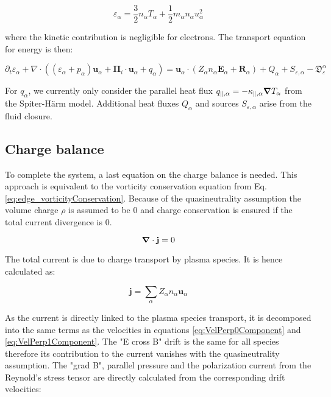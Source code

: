 \begin{equation}
	\varepsilon_\alpha = \frac{3}{2} n_\alpha T_\alpha + \frac{1}{2} m_\alpha n_\alpha u_\alpha^2
\end{equation}

where the kinetic contribution is negligible for electrons. The transport equation for energy is then: 

\begin{equation}
	\partial_t \varepsilon_\alpha + \nabla \cdot \left( (\varepsilon_\alpha + p_\alpha)\mathbf{u}_\alpha + \boldsymbol{\Pi}_i\cdot\mathbf{u}_\alpha + q_\alpha \right) = \mathbf{u}_\alpha \cdot \left(Z_\alpha n_\alpha\mathbf{E}_\alpha + \mathbf{R}_\alpha \right) + Q_\alpha + S_{\varepsilon,\alpha} - \mathfrak{D}_\varepsilon^\alpha
\end{equation}

For $q_\alpha$, we currently only consider the parallel heat flux $q_{\parallel,\alpha} = -\kappa_{\parallel,\alpha}\grad T_\alpha$ from the Spiter-Härm model. Additional heat fluxes $Q_\alpha$ and sources $S_{\varepsilon,\alpha}$ arise from the fluid closure.



\subsection{Charge balance}

To complete the system, a last equation on the charge balance is needed. This approach is equivalent to the vorticity conservation equation from Eq. \ref{eq:edge_vorticityConservation}. Because of the quasineutrality assumption the volume charge $\rho$ is assumed to be 0 and charge conservation is ensured if the total current divergence is 0.

\begin{equation}
	\grad\cdot\mathbf{j} = 0
\end{equation}

The total current is due to charge transport by plasma species. It is hence calculated as: 

\begin{equation}
	\mathbf{j} = \sum_{\alpha} Z_\alpha n_\alpha \mathbf{u}_\alpha
\end{equation}

As the current is directly linked to the plasma species transport, it is decomposed into the same terms as the velocities in equations \ref{eq:VelPerp0Component} and \ref{eq:VelPerp1Component}. The "E cross B" drift is the same for all species therefore its contribution to the current vanishes with the quasineutrality assumption. The "grad B", parallel pressure and the polarization current from the Reynold's stress tensor are directly calculated from the corresponding drift velocities:

